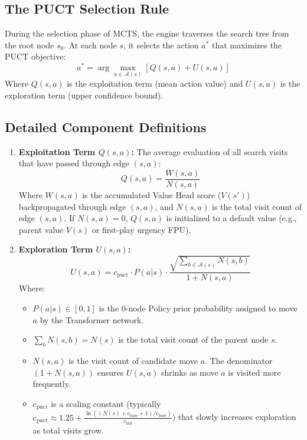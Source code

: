 \documentclass[11pt,a4paper]{report}
\begin{document}
\subsection{The PUCT Selection Rule}
During the selection phase of MCTS, the engine traverses the search tree from the root node $s_0$. At each node $s$, it selects the action $a^*$ that maximizes the PUCT objective:
\begin{equation}
\label{eq:puct}
a^* = \arg\max_{a \in \mathcal{A}(s)} \left[ Q(s,a) + U(s,a) \right]
\end{equation}
Where $Q(s,a)$ is the exploitation term (mean action value) and $U(s,a)$ is the exploration term (upper confidence bound).

\subsection{Detailed Component Definitions}
\begin{enumerate}
    \item \textbf{Exploitation Term $Q(s,a)$:}
    The average evaluation of all search visits that have passed through edge $(s,a)$:
    \begin{equation}
    Q(s,a) = \frac{W(s,a)}{N(s,a)}
    \end{equation}
    Where $W(s,a)$ is the accumulated Value Head score ($V(s')$) backpropagated through edge $(s,a)$, and $N(s,a)$ is the total visit count of edge $(s,a)$. If $N(s,a) = 0$, $Q(s,a)$ is initialized to a default value (e.g., parent value $V(s)$ or first-play urgency FPU).
    
    \item \textbf{Exploration Term $U(s,a)$:}
    \begin{equation}
    U(s,a) = c_{\text{puct}} \cdot P(a|s) \cdot \frac{\sqrt{\sum_{b \in \mathcal{A}(s)} N(s,b)}}{1 + N(s,a)}
    \end{equation}
    Where:
    \begin{itemize}
        \item $P(a|s) \in [0,1]$ is the 0-node Policy prior probability assigned to move $a$ by the Transformer network.
        \item $\sum_{b} N(s,b) = N(s)$ is the total visit count of the parent node $s$.
        \item $N(s,a)$ is the visit count of candidate move $a$. The denominator $(1 + N(s,a))$ ensures $U(s,a)$ shrinks as move $a$ is visited more frequently.
        \item $c_{\text{puct}}$ is a scaling constant (typically $c_{\text{puct}} \approx 1.25 + \frac{\ln((N(s) + c_{\text{base}} + 1)/c_{\text{base}})}{c_{\text{init}}}$) that slowly increases exploration as total visits grow.
    \end{itemize}
\end{enumerate}
\end{document}
